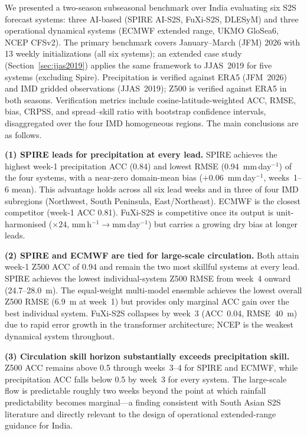 \documentclass[11pt,a4paper]{article}
\begin{document}
We presented a two-season subseasonal benchmark over India evaluating
six S2S forecast systems: three AI-based (SPIRE AI-S2S, FuXi-S2S, DLESyM)
and three operational dynamical systems (ECMWF extended range, UKMO GloSea6,
NCEP CFSv2). The primary benchmark covers January--March (JFM) 2026 with
13 weekly initializations (all six systems); an extended case study
(Section~\ref{sec:jjas2019}) applies the same framework to JJAS~2019 for
five systems (excluding Spire). Precipitation is verified against ERA5
(JFM~2026) and IMD gridded observations (JJAS~2019); Z500 is verified against
ERA5 in both seasons. Verification metrics include cosine-latitude-weighted ACC,
RMSE, bias, CRPSS, and spread--skill ratio with bootstrap confidence intervals,
disaggregated over the four IMD homogeneous regions. The main conclusions
are as follows.

\textbf{(1) SPIRE leads for precipitation at every lead.}
SPIRE achieves the highest week-1 precipitation ACC (0.84) and lowest
RMSE (0.94~mm\,day$^{-1}$) of the four systems, with a near-zero
domain-mean bias ($+0.06$~mm\,day$^{-1}$, weeks~1--6 mean). This
advantage holds across all six lead weeks and in three of four IMD
subregions (Northwest, South Peninsula, East/Northeast). ECMWF is the
closest competitor (week-1 ACC 0.81). FuXi-S2S is competitive once its
output is unit-harmonised ($\times24$, mm\,h$^{-1}\!\to$mm\,day$^{-1}$)
but carries a growing dry bias at longer leads.

\textbf{(2) SPIRE and ECMWF are tied for large-scale circulation.}
Both attain week-1 Z500 ACC of 0.94 and remain the two most skillful
systems at every lead. SPIRE achieves the lowest individual-system Z500
RMSE from week~4 onward (24.7--28.0~m). The equal-weight multi-model
ensemble achieves the lowest overall Z500 RMSE (6.9~m at week~1) but
provides only marginal ACC gain over the best individual system. FuXi-S2S
collapses by week~3 (ACC~0.04, RMSE~40~m) due to rapid error growth in
the transformer architecture; NCEP is the weakest dynamical system
throughout.

\textbf{(3) Circulation skill horizon substantially exceeds precipitation
skill.}
Z500 ACC remains above 0.5 through weeks~3--4 for SPIRE and ECMWF,
while precipitation ACC falls below 0.5 by week~3 for every system. The
large-scale flow is predictable roughly two weeks beyond the point at
which rainfall predictability becomes marginal---a finding consistent
with South Asian S2S literature \citep{deandrade2019,white2017} and
directly relevant to the design of operational extended-range guidance
for India.
\end{document}
